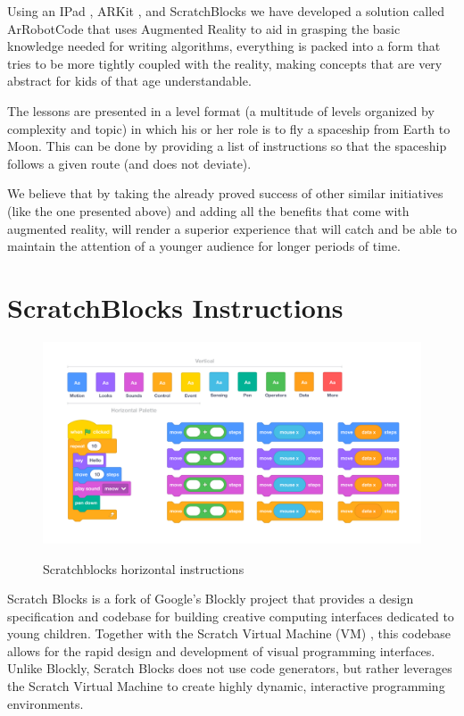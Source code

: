 \documentclass[12 pct]{report}
\begin{document}
Using an IPad \cite{henderson2012ipad}, ARKit \cite{wang2018understanding} , and ScratchBlocks \cite{resnick2009scratch} we have developed a solution called ArRobotCode that uses Augmented Reality to aid in grasping the basic knowledge needed for writing algorithms, everything is packed into a form that tries to be more tightly coupled with the reality, making concepts that are very abstract for kids of that age understandable.

The lessons are presented in a level format (a multitude of levels organized by complexity and topic) in which his or her role is to fly a spaceship from Earth to Moon. This can be done by providing a list of instructions so that the spaceship follows a given route (and does not deviate).

We believe that by taking the already proved success of other similar initiatives (like the one presented above) and adding all the benefits that come with augmented reality, will render a superior experience that will catch and be able to maintain the attention of a younger audience for longer periods of time.

\section{ScratchBlocks Instructions}
\begin{figure}[H]
\includegraphics[width=1.0\textwidth]{scratchblocks-2}
\centering
\label{fig:hololens}
\caption{Scratchblocks horizontal instructions}
\end{figure}

Scratch Blocks is a fork of Google's Blockly project that provides a design specification and codebase for building creative computing interfaces dedicated to young children. Together with the Scratch Virtual Machine (VM) \cite{scratchvm} , this codebase allows for the rapid design and development of visual programming interfaces. Unlike Blockly, Scratch Blocks does not use code generators, but rather leverages the Scratch Virtual Machine to create highly dynamic, interactive programming environments.
\end{document}
